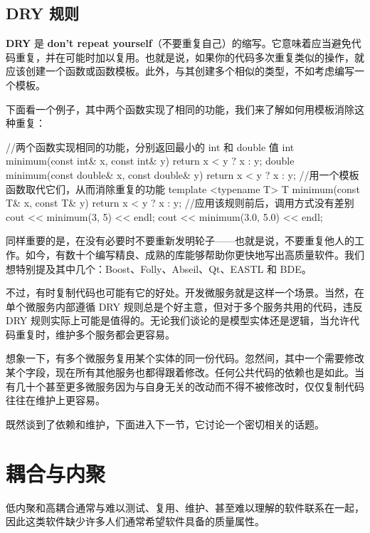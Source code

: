 \subsection{DRY 规则}

\label{idx:066}
\textbf{DRY} 是 \textbf{don’t repeat yourself}（不要重复自己）的缩写。它意味着应当避免代码重复，并在可能时加以复用。也就是说，如果你的代码多次重复类似的操作，就应该创建一个函数或函数模板。此外，与其创建多个相似的类型，不如考虑编写一个模板。

下面看一个例子，其中两个函数实现了相同的功能，我们来了解如何用模板消除这种重复：

\begin{codebox}[cpp]
//两个函数实现相同的功能，分别返回最小的 int 和 double 值
int minimum(const int& x, const int& y) { return x < y ? x : y; }
double minimum(const double& x, const double& y) { return x < y ? x : y; }
//用一个模板函数取代它们，从而消除重复的功能
template <typename T>
T minimum(const T& x, const T& y) {
    return x < y ? x : y;
}
//应用该规则前后，调用方式没有差别
cout << minimum(3, 5) << endl;
cout << minimum(3.0, 5.0) << endl;
\end{codebox}

同样重要的是，在没有必要时不要重新发明轮子——也就是说，不要重复他人的工作。如今，有数十个编写精良、成熟的库能够帮助你更快地写出高质量软件。我们想特别提及其中几个：Boost、Folly、Abseil、Qt、EASTL 和 BDE。

不过，有时复制代码也可能有它的好处。开发微服务就是这样一个场景。当然，在单个微服务内部遵循 DRY 规则总是个好主意，但对于多个服务共用的代码，违反 DRY 规则实际上可能是值得的。无论我们谈论的是模型实体还是逻辑，当允许代码重复时，维护多个服务都会更容易。

想象一下，有多个微服务复用某个实体的同一份代码。忽然间，其中一个需要修改某个字段，现在所有其他服务也都得跟着修改。任何公共代码的依赖也是如此。当有几十个甚至更多微服务因为与自身无关的改动而不得不被修改时，仅仅复制代码往往在维护上更容易。

既然谈到了依赖和维护，下面进入下一节，它讨论一个密切相关的话题。

\section{耦合与内聚}

\label{idx:067}
低内聚和高耦合通常与难以测试、复用、维护、甚至难以理解的软件联系在一起，因此这类软件缺少许多人们通常希望软件具备的质量属性。


